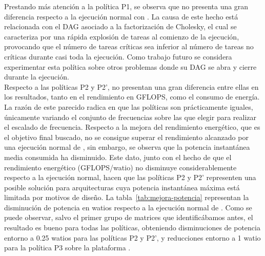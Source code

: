 Prestando más atención a la política P1, se observa que no presenta una
gran diferencia respecto a la ejecución normal con \botlev. La causa de este
hecho está relacionada con el DAG asociado a la factorización de Cholesky,
el cual se caracteriza por una rápida explosión de tareas al comienzo de la
ejecución, provocando que el número de tareas críticas sea inferior al
número de tareas no críticas durante casi toda la ejecución. Como trabajo
futuro se considera experimentar esta política sobre otros problemas donde
su DAG se abra y cierre durante la ejecución.\\
Respecto a las políticas P2 y P2', no presentan una gran diferencia entre
ellas en los resultados, tanto en el rendimiento en GFLOPS, como el consumo
de energía. La razón de este parecido radica en que las políticas son
prácticamente iguales, únicamente variando el conjunto de frecuencias sobre
las que elegir para realizar el escalado de frecuencia. Respecto a la
mejora del rendimiento energético, que es el objetivo final buscado, no se
consigue superar el rendimiento alcanzado por una ejecución normal de
\botlev, sin embargo, se observa que la potencia instantánea media consumida
ha disminuido. Este dato, junto con el hecho de que el rendimiento
energético (GFLOPS/watio) no disminuye considerablemente respecto a la
ejecución normal, hacen que las políticas P2 y P2' representen una posible
solución para arquitecturas cuya potencia instantánea máxima está limitada
por motivos de diseño. La tabla~\ref{tab:mejora-potencia} representan la
disminución de potencia en watios respecto a la ejecución normal de
\botlev. Como se puede observar, salvo el primer grupo de matrices que
identificábamos antes, el resultado es bueno para todas las políticas,
obteniendo disminuciones de potencia entorno a 0.25 watios para las
políticas P2 y P2', y reducciones entorno a 1 watio para la política P3
sobre la plataforma \juno.

